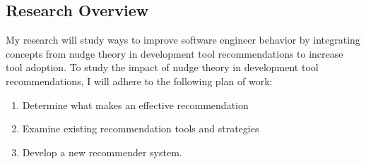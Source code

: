 \subsection{Research Overview}

My research will study ways to improve software engineer behavior by integrating concepts from nudge theory in development tool recommendations to increase tool adoption. To study the impact of nudge theory in development tool recommendations, I will adhere to the following plan of work:

\begin{enumerate}
    \item Determine what makes an effective recommendation
    \item Examine existing recommendation tools and strategies
    \item Develop a new recommender system.
\end{enumerate}